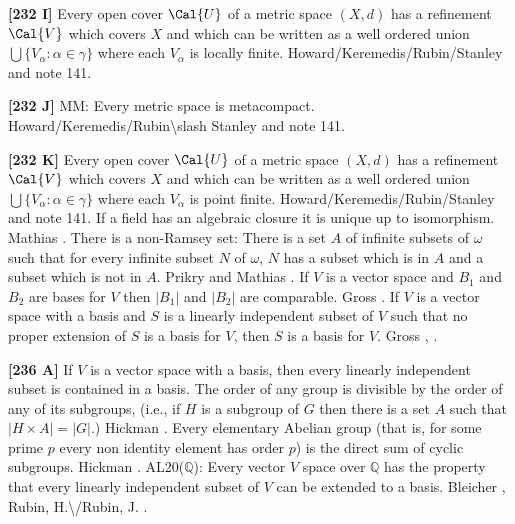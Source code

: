 \smallskip
\item{}{\bf [232 I]} Every open cover $\Cal{U}$ of a metric space $(X,d)$
has a refinement $\Cal{V}$ which covers $X$ and which can be written as a
well ordered union $\bigcup \{V_\alpha :\alpha\in\gamma\}$ where each
$V_\alpha$ is locally finite. \ac{Howard/Keremedis/Rubin/Stanley}
\cite{1999} and note 141.
\smallskip
\item{}{\bf [232 J]} MM: Every metric space is metacompact.
\ac{Howard/Keremedis/Rubin\slash Stanley} \cite{1999} and note 141.
\smallskip
\item{}{\bf [232 K]} Every open cover $\Cal{U}$ of a metric space $(X,d)$
has a refinement $\Cal{V}$ which covers $X$ and which can be written as a
well ordered union $\bigcup \{V_\alpha :\alpha\in\gamma\}$ where each
$V_\alpha $ is point finite. \ac{Howard/Keremedis/Rubin/Stanley}
\cite{1999} and note 141.
\medskip
{} If a field has an algebraic closure it is unique
up to isomorphism. \ac{Mathias} \cite{1977b}. 
\medskip
{} There is a non-Ramsey set: There is a set $A$ of
infinite subsets of $\omega$ such that for every infinite subset $N$ of
$\omega$, $N$ has a subset which is in $A$ and a subset which is not
in $A$.  \ac{Prikry} \cite{1976} and \ac{Mathias} \cite{1968}.
\medskip
{} If $V$ is a vector space and $B_{1}$ and $B_{2}$
are bases for $V$ then $|B_{1}|$ and $|B_{2}|$ are comparable. \ac{Gross}
\cite{1976}.
\medskip
{} If $V$ is a vector space with a basis and $S$ is
a linearly independent subset of $V$ such that no proper extension of $S$
is a basis for $V$, then $S$ is a basis for $V$.  \ac{Gross} \cite{1975},
\cite{1976}.
\smallskip
\item{}{\bf [236 A]} If $V$ is a vector space with a basis, then every
linearly independent subset is contained in a basis.
\medskip
{} The order of any group is divisible by the order
of any of its subgroups, (i.e., if $H$ is a subgroup of $G$ then there
is a set $A$ such that $|H\times A| = |G|$.)  \ac{Hickman} \cite{1976}.
\medskip
{} Every elementary Abelian group (that is, for
some prime $p$ every non identity element has order $p$) is the direct sum
of cyclic subgroups.  \ac{Hickman} \cite{1976}.
\medskip
{} AL20($\mathbb Q$):  Every vector $V$ space over
$\mathbb Q$ has the property that every linearly independent subset of $V$
can be extended to a basis. \ac{Bleicher} \cite{1964}, \ac{Rubin,
H.\/Rubin, J.} \cite{1985, p.119, AL20}.
